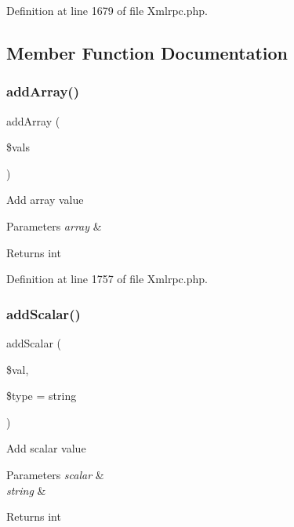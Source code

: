 Definition at line 1679 of file Xmlrpc.\+php.



\subsection{Member Function Documentation}
\mbox{\label{class_x_m_l___r_p_c___values_a2081e6a72b7e1c15f8c1dbcdfa673d4c}} 
\subsubsection{\texorpdfstring{addArray()}{addArray()}}
{\footnotesize\ttfamily add\+Array (\begin{DoxyParamCaption}\item[{}]{\$vals }\end{DoxyParamCaption})}

Add array value


\begin{DoxyParams}{Parameters}
{\em array} & \\
\hline
\end{DoxyParams}
\begin{DoxyReturn}{Returns}
int 
\end{DoxyReturn}


Definition at line 1757 of file Xmlrpc.\+php.

\mbox{\label{class_x_m_l___r_p_c___values_ac847166eee63ab7bfaa8b0e22ae19430}} 
\subsubsection{\texorpdfstring{addScalar()}{addScalar()}}
{\footnotesize\ttfamily add\+Scalar (\begin{DoxyParamCaption}\item[{}]{\$val,  }\item[{}]{\$type = {\ttfamily \textquotesingle{}string\textquotesingle{}} }\end{DoxyParamCaption})}

Add scalar value


\begin{DoxyParams}{Parameters}
{\em scalar} & \\
\hline
{\em string} & \\
\hline
\end{DoxyParams}
\begin{DoxyReturn}{Returns}
int 
\end{DoxyReturn}


